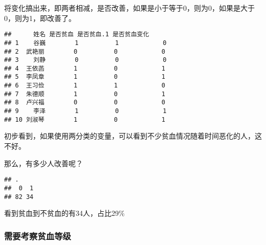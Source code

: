 \documentclass[
]{article}
\newenvironment{Shaded}{\begin{snugshade}}{\end{snugshade}}
\newcommand{\DecValTok}[1]{\textcolor[rgb]{0.00,0.00,0.81}{#1}}
\newcommand{\FloatTok}[1]{\textcolor[rgb]{0.00,0.00,0.81}{#1}}
\newcommand{\FunctionTok}[1]{\textcolor[rgb]{0.00,0.00,0.00}{#1}}
\newcommand{\NormalTok}[1]{#1}
\newcommand{\OtherTok}[1]{\textcolor[rgb]{0.56,0.35,0.01}{#1}}
\newcommand{\SpecialCharTok}[1]{\textcolor[rgb]{0.00,0.00,0.00}{#1}}
\newcommand{\StringTok}[1]{\textcolor[rgb]{0.31,0.60,0.02}{#1}}
\begin{document}
将变化搞出来，即两者相减，是否改善，如果是小于等于0，则为0，如果是大于0，则为1，即改善了。

\begin{Shaded}
\end{Shaded}

\begin{verbatim}
##      姓名 是否贫血 是否贫血.1 是否贫血变化
## 1    谷巍        1          1            0
## 2  武艳丽        0          0            0
## 3    刘静        0          0            0
## 4  王依菡        1          0            1
## 5  李凤章        1          0            1
## 6  王习俭        1          1            0
## 7  朱德顺        1          0            1
## 8  卢兴福        0          0            0
## 9    李泽        1          0            1
## 10 刘淑琴        1          0            1
\end{verbatim}

初步看到，如果使用两分类的变量，可以看到不少贫血情况随着时间恶化的人，这不好。

那么，有多少人改善呢？

\begin{Shaded}
\end{Shaded}

\begin{verbatim}
## .
##  0  1 
## 82 34
\end{verbatim}

看到贫血到不贫血的有34人，占比29\%

\hypertarget{ux9700ux8981ux8003ux5bdfux8d2bux8840ux7b49ux7ea7}{%
\subsubsection{需要考察贫血等级}\label{ux9700ux8981ux8003ux5bdfux8d2bux8840ux7b49ux7ea7}}
\end{document}
